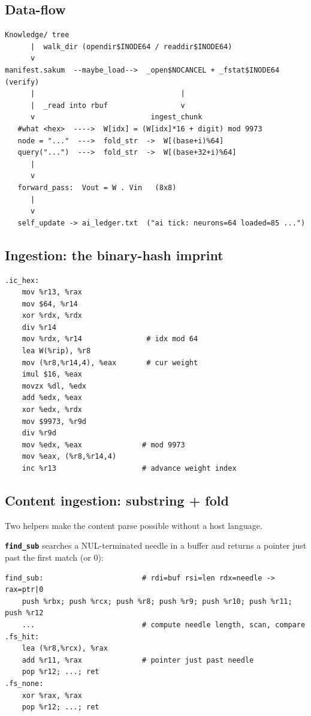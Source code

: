\subsection{Data-flow}

\begin{verbatim}
Knowledge/ tree
      |  walk_dir (opendir$INODE64 / readdir$INODE64)
      v
manifest.sakum  --maybe_load-->  _open$NOCANCEL + _fstat$INODE64 (verify)
      |                                  |
      |  _read into rbuf                 v
      v                           ingest_chunk
   #what <hex>  ---->  W[idx] = (W[idx]*16 + digit) mod 9973
   node = "..."  --->  fold_str  ->  W[(base+i)%64]
   query("...")  --->  fold_str  ->  W[(base+32+i)%64]
      |
      v
   forward_pass:  Vout = W . Vin   (8x8)
      |
      v
   self_update -> ai_ledger.txt  ("ai tick: neurons=64 loaded=85 ...")
\end{verbatim}

\subsection{Ingestion: the binary-hash imprint}

\begin{lstlisting}[language=SakumAsm,caption={Hex fold into W (sakum\_ai.s:766).}]
.ic_hex:
    mov %r13, %rax
    mov $64, %r14
    xor %rdx, %rdx
    div %r14
    mov %rdx, %r14               # idx mod 64
    lea W(%rip), %r8
    mov (%r8,%r14,4), %eax       # cur weight
    imul $16, %eax
    movzx %dl, %edx
    add %edx, %eax
    xor %edx, %rdx
    mov $9973, %r9d
    div %r9d
    mov %edx, %eax              # mod 9973
    mov %eax, (%r8,%r14,4)
    inc %r13                    # advance weight index
\end{lstlisting}

\subsection{Content ingestion: substring + fold}

Two helpers make the content parse possible without a host language.

\textbf{\texttt{find\_sub}} searches a NUL-terminated needle in a buffer and
returns a pointer just past the first match (or 0):

\begin{lstlisting}[language=SakumAsm,caption={Substring search skeleton (sakum\_ai.s).}]
find_sub:                       # rdi=buf rsi=len rdx=needle -> rax=ptr|0
    push %rbx; push %rcx; push %r8; push %r9; push %r10; push %r11; push %r12
    ...                         # compute needle length, scan, compare
.fs_hit:
    lea (%r8,%rcx), %rax
    add %r11, %rax              # pointer just past needle
    pop %r12; ...; ret
.fs_none:
    xor %rax, %rax
    pop %r12; ...; ret
\end{lstlisting}

